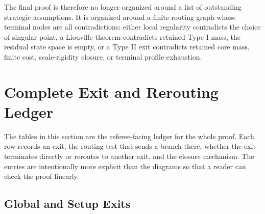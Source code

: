 \documentclass[11pt]{amsart}
\begin{document}
The final proof is therefore no longer organized around a list of outstanding strategic assumptions.  It is organized around a finite routing graph whose terminal nodes are all contradictions: either local regularity contradicts the choice of singular point, a Liouville theorem contradicts retained Type I mass, the residual state space is empty, or a Type II exit contradicts retained core mass, finite cost, scale-rigidity closure, or terminal profile exhaustion.

\section{Complete Exit and Rerouting Ledger}
\label{sec:complete-exit-ledger}

The tables in this section are the referee-facing ledger for the whole proof. Each row records an exit, the routing test that sends a branch there, whether the exit terminates directly or reroutes to another exit, and the closure mechanism.  The entries are intentionally more explicit than the diagrams so that a reader can check the proof linearly.

\subsection{Global and Setup Exits}
\end{document}
